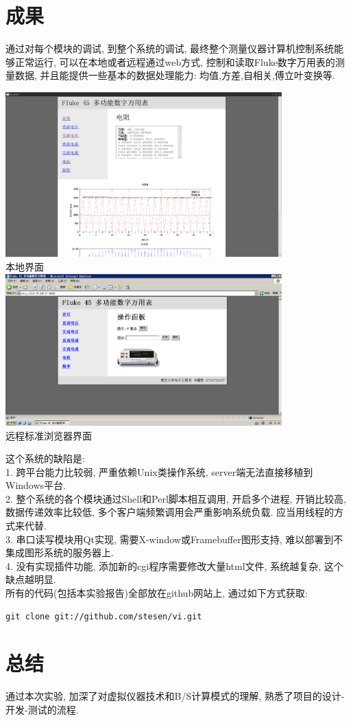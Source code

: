\documentclass{article}
\begin{document}
\section{成果}
通过对每个模块的调试, 到整个系统的调试, 最终整个测量仪器计算机控制系统能够正常运行, 可以在本地或者远程通过web方式, 控制和读取Fluke数字万用表的测量数据, 并且能提供一些基本的数据处理能力: 均值,方差,自相关,傅立叶变换等.\\
\begin{center}
\includegraphics[width=0.8\textwidth]{image/localui1.eps}\\
本地界面\\[2em]
\includegraphics[width=0.8\textwidth]{image/remoteui.eps}\\
远程标准浏览器界面\\[2em]
\end{center}
这个系统的缺陷是:\\
1. 跨平台能力比较弱, 严重依赖Unix类操作系统, server端无法直接移植到Windows平台.\\
2. 整个系统的各个模块通过Shell和Perl脚本相互调用, 开启多个进程, 开销比较高, 数据传递效率比较低, 多个客户端频繁调用会严重影响系统负载. 应当用线程的方式来代替.\\
3. 串口读写模块用Qt实现, 需要X-window或Framebuffer图形支持, 难以部署到不集成图形系统的服务器上.\\
4. 没有实现插件功能, 添加新的cgi程序需要修改大量html文件, 系统越复杂, 这个缺点越明显.\\[2em]

所有的代码(包括本实验报告)全部放在github网站上, 通过如下方式获取:\\
\begin{lstlisting}
git clone git://github.com/stesen/vi.git
\end{lstlisting}
\section{总结}
通过本次实验, 加深了对虚拟仪器技术和B/S计算模式的理解, 熟悉了项目的设计-开发-测试的流程.


\end{document}
